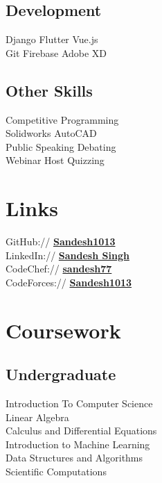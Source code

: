 \documentclass[]{deedy-resume-openfont}
\begin{document}
\begin{minipage}[t]{0.30\textwidth}
\subsection{Development}
\textbullet{} Django \textbullet{} Flutter \textbullet{}  Vue.js  \\
\textbullet{} Git \textbullet{} Firebase \textbullet{} Adobe XD \\
\sectionsep

\subsection{Other Skills}
\textbullet{} Competitive Programming \\
\textbullet{} Solidworks \textbullet{} AutoCAD \\
\textbullet{} Public Speaking \textbullet{} Debating  \\
\textbullet{} Webinar Host \textbullet{} Quizzing \\


\section{Links} 
GitHub:// \href{https://github.com/Sandesh1013}{\bf Sandesh1013 \faExternalLink}\\
LinkedIn://  \href{https://www.linkedin.com/in/sandesh-singh-1596281a0/}{\bf Sandesh Singh \faExternalLink} \\
CodeChef:// \href{https://www.codechef.com/users/sandesh77}{\bf sandesh77 \faExternalLink} \\
CodeForces:// \href{https://codeforces.com/profile/Sandesh1013}{\bf Sandesh1013 \faExternalLink} \\


\section{Coursework}
\subsection{Undergraduate}
Introduction To Computer Science \\
Linear Algebra \\
Calculus and Differential Equations\\
Introduction to Machine Learning\\
Data Structures and Algorithms\\
Scientific Computations \\

\end{minipage}
\end{document}
